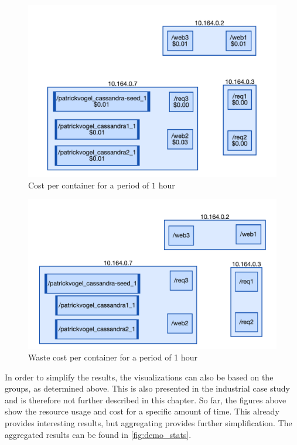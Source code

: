 \begin{figure}
    \centering
    \includegraphics[width=\textwidth]{gfx/demo_cost}
    \caption{Cost per container for a period of $1$ hour}
    \label{fig:demo_cost}
\end{figure}

\begin{figure}
    \centering
    \includegraphics[width=\textwidth]{gfx/demo_app}
    \caption{Waste cost per container for a period of 1 hour}
    \label{fig:demo_waste}
\end{figure}

\noindent
In order to simplify the results, the visualizations can also be based on the groups, as determined above. This is also presented in the industrial case study and is therefore not further described in this chapter. So far, the figures above show the resource usage and cost for a specific amount of time. This already provides interesting results, but aggregating provides further simplification. The aggregated results can be found in \autoref{fig:demo_stats}.

